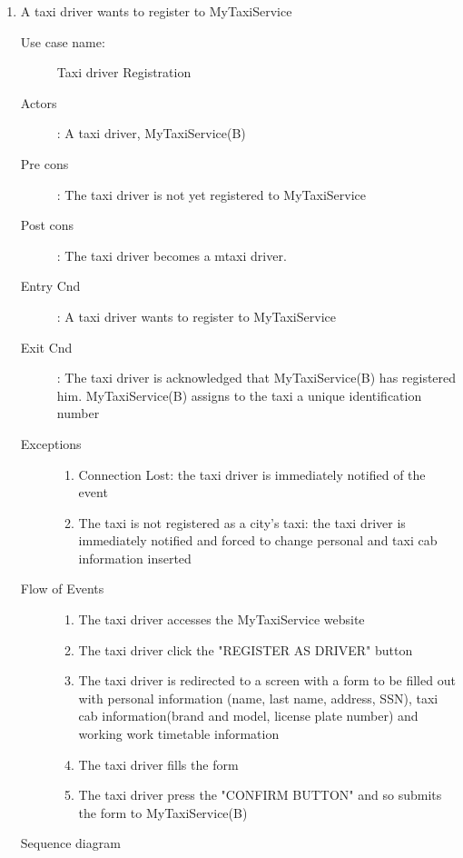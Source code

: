 \documentclass[11pt,titlepage]{article} %
\begin{document}
\begin{enumerate}
	      \item A taxi driver wants to register to MyTaxiService
		\begin{description}
		        \item [Use case name:] Taxi driver Registration
		        \item [Actors]: A taxi driver, MyTaxiService(B)
		        \item [Pre cons]: The taxi driver is not yet registered to MyTaxiService
		        \item [Post cons]: The taxi driver becomes a mtaxi driver.
		        \item [Entry Cnd]: A taxi driver wants to register to MyTaxiService
		        \item [Exit Cnd]: The taxi driver is acknowledged that MyTaxiService(B) has registered him. MyTaxiService(B)
		        assigns to the taxi a unique identification number
		        \item [Exceptions] \hfill
			\begin{enumerate}
			          \item Connection Lost: the taxi driver is immediately notified of the event
			          \item The taxi is not registered as a city's taxi: the taxi driver is immediately notified
			          and forced to change personal and taxi cab information inserted
			\end{enumerate}
		        \item [Flow of Events]\hfill
			\begin{enumerate}
			          \item The taxi driver accesses the MyTaxiService website
			          \item The taxi driver click the "REGISTER AS DRIVER" button
			          \item The taxi driver is redirected to a screen with a form to be filled out with personal information (name, last name, address, SSN),
			           taxi cab information(brand and model, license plate number) and working work timetable information
			          \item The taxi driver fills the form
			          \item The taxi driver press the "CONFIRM BUTTON" and so submits the form to MyTaxiService(B)
			\end{enumerate}
		\end{description}
		Sequence diagram
		\begin{center}

\end{center}
\end{enumerate}
\end{document}
